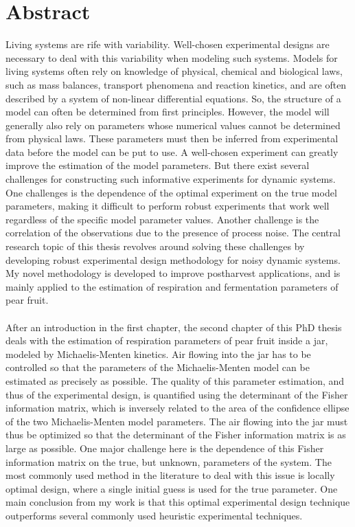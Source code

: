 \chapter*{Abstract}
Living systems are rife with variability. Well-chosen experimental designs are necessary to deal with this variability when modeling such systems. Models for living systems often rely on knowledge of physical, chemical and biological laws, such as mass balances, transport phenomena and reaction kinetics, and are often described by a system of non-linear differential equations. So, the structure of a model can often be determined from first principles. However, the model will generally also rely on parameters whose numerical values cannot be determined from physical laws. These parameters must then be inferred from experimental data before the model can be put to use. A well-chosen experiment can greatly improve the estimation of the model parameters. But there exist several challenges for constructing such informative experiments for dynamic systems. One challenges is the dependence of the optimal experiment on the true model parameters, making it difficult to perform robust experiments that work well regardless of the specific model parameter values. Another challenge is the correlation of the observations due to the presence of process noise. The central research topic of this thesis revolves around solving these challenges by developing robust experimental design methodology for noisy dynamic systems. My novel methodology is developed to improve postharvest applications, and is mainly applied to the estimation of respiration and fermentation parameters of pear fruit. 
\\
\\
After an introduction in the first chapter, the second chapter of this PhD thesis deals with the estimation of respiration parameters of pear fruit inside a jar, modeled by Michaelis-Menten kinetics. Air flowing into the jar has to be controlled so that the parameters of the Michaelis-Menten model can be estimated as precisely as possible. The quality of this parameter estimation, and thus of the experimental design, is quantified using the determinant of the Fisher information matrix, which is inversely related to the area of the confidence ellipse of the two Michaelis-Menten model parameters. The air flowing into the jar must thus be optimized so that the determinant of the Fisher information matrix is as large as possible. One major challenge here is the dependence of this Fisher information matrix on the true, but unknown, parameters of the system. The most commonly used method in the literature to deal with this issue is locally optimal design, where a single initial guess is used for the true parameter. One main conclusion from my work is that this optimal experimental design technique outperforms several commonly used heuristic experimental techniques.

